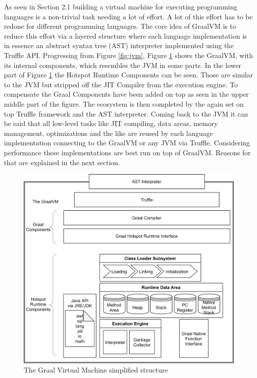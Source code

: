 As seen in Section 2.1 building a virtual machine for executing programming languages is a non-trivial task needing a lot of effort. A lot of this effort has to be redone for different programming languages. The core idea of GraalVM is to reduce this effort via a layered structure where each language implementation is in essence an abstract syntax tree (AST) interpreter implemented using the Truffle API. Progressing from Figure \ref{fig:jvm}, Figure \ref{fig:graalvm} shows the GraalVM, with its internal components, which resembles the JVM in some parts. In the lower part of Figure \ref{fig:graalvm} the Hotspot Runtime Components can be seen.  Those are similar to the JVM but stripped off the JIT Compiler from the execution engine. To compensate the Graal Components have been added on top as seen in the upper middle part of the figure. The ecosystem is then completed by the again set on top Truffle framework and the AST interpreter. Coming back to the JVM it can be said that all low-level tasks like JIT compiling, data areas, memory management, optimizations and the like are reused by each language implementation connecting to the GraalVM or any JVM via Truffle. Considering performance these implementations are best run on top of GraalVM. Reasons for that are explained in the next section.

\begin{figure}[h!]
    \centering
    \includegraphics[scale=0.8]{figures/GraalVM.png}
    \caption{The Graal Virtual Machine simplified structure}
    \label{fig:graalvm}
\end{figure}

